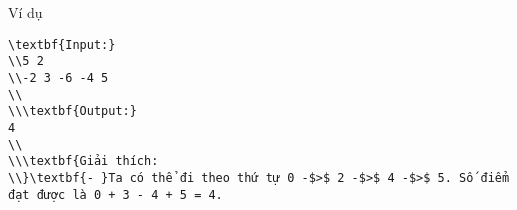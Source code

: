 Ví dụ
\begin{verbatim}
\textbf{Input:}
\\5 2
\\-2 3 -6 -4 5
\\
\\\textbf{Output:}
4
\\
\\\textbf{Giải thích:
\\}\textbf{- }Ta có thể đi theo thứ tự 0 -$>$ 2 -$>$ 4 -$>$ 5. Số điểm đạt được là 0 + 3 - 4 + 5 = 4.\end{verbatim}